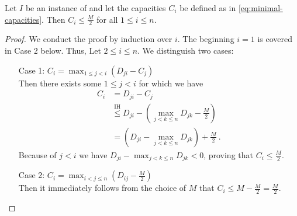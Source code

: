 \begin{lemma}
	\label{lemma:capacities-bounded}
	Let $I$ be an instance of \RRL and let the capacities $C_i$ be defined as in \cref{eq:minimal-capacities}.
	Then $C_i \leq \frac{M}{2}$ for all $1 \leq i \leq n$.
\end{lemma}
\begin{proof}
	We conduct the proof by induction over $i$. 
	The beginning $i=1$ is covered in Case 2 below. 
	Thus, Let $2 \leq i \leq n$.
	We distinguish two cases:
	\begin{enumerate}[align=left]
		\item[Case 1: $C_i = \max_{1 \leq j < i}(D_{ji} - C_j)$]{\mbox{}\\
			Then there exists some $1 \leq j < i$ for which we have
			\begin{align}
				C_i &= D_{ji} - C_j \\
				&\stackrel{\mathrm{IH}}{\leq} D_{ji} - \left(\max_{j < k \leq n} D_{jk} - \frac{M}{2}\right)\\
				&= (D_{ji} - \max_{j < k \leq n} D_{jk}) + \frac{M}{2} \ .
			\end{align}
			Because of $j < i$ we have $D_{ji} - \max_{j < k \leq n} D_{jk} < 0$, proving that $C_i \leq \frac{M}{2}$.
		}
		\item[Case 2: $C_i = \max_{i < j \leq n}(D_{ij} - \frac{M}{2})$]{\mbox{}\\
			Then it immediately follows from the choice of $M$ that $C_i \leq M - \frac{M}{2} = \frac{M}{2}$.
		}
	\end{enumerate}
\end{proof}

